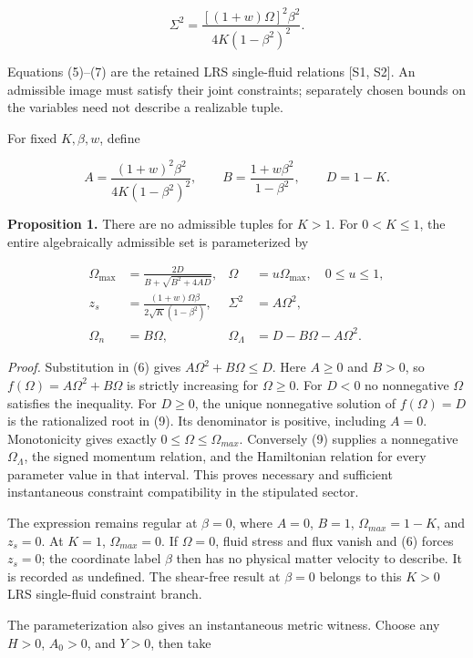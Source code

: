 \documentclass[aps,prd,reprint,onecolumn,nofootinbib]{revtex4-2}
\begin{document}
\[
 \boxed{\displaystyle
 \Sigma^2=\frac{[(1+w)\Omega]^2\beta^2}
                    {4K(1-\beta^2)^2}.}
 \tag{7}
\]

Equations (5)--(7) are the retained LRS single-fluid relations {[}S1, S2{]}. An admissible image must satisfy their joint constraints; separately chosen bounds on the variables need not describe a realizable tuple.

For fixed \(K,\beta,w\), define

\[
 A=\frac{(1+w)^2\beta^2}{4K(1-\beta^2)^2},\qquad
 B=\frac{1+w\beta^2}{1-\beta^2},\qquad D=1-K.
 \tag{8}
\]

\textbf{Proposition 1.} There are no admissible tuples for \(K>1\). For \(0<K\le 1\), the entire algebraically admissible set is parameterized by

\[
 \begin{aligned}
 \Omega_{\max}&=\frac{2D}{B+\sqrt{B^2+4AD}},
 &\Omega&=u\Omega_{\max},\quad 0\le u\le1,\\
 z_s&=\frac{(1+w)\Omega\beta}{2\sqrt K(1-\beta^2)},
 &\Sigma^2&=A\Omega^2,\\
 \Omega_n&=B\Omega,
 &\Omega_\Lambda&=D-B\Omega-A\Omega^2.
 \end{aligned}
 \tag{9}
\]

\emph{Proof.} Substitution in (6) gives \(A\Omega^2+B\Omega\le D\). Here \(A\ge 0\) and \(B>0\), so \(f(\Omega)=A\Omega^2+B\Omega\) is strictly increasing for \(\Omega\ge 0\). For \(D<0\) no nonnegative \(\Omega\) satisfies the inequality. For \(D\ge 0\), the unique nonnegative solution of \(f(\Omega)=D\) is the rationalized root in (9). Its denominator is positive, including \(A=0\). Monotonicity gives exactly \(0\le \Omega\le \Omega_{max}\). Conversely (9) supplies a nonnegative \(\Omega_\Lambda\), the signed momentum relation, and the Hamiltonian relation for every parameter value in that interval. This proves necessary and sufficient instantaneous constraint compatibility in the stipulated sector.

The expression remains regular at \(\beta=0\), where \(A=0\), \(B=1\), \(\Omega_{max}=1-K\), and \(z_s=0\). At \(K=1\), \(\Omega_{max}=0\). If \(\Omega=0\), fluid stress and flux vanish and (6) forces \(z_s=0\); the coordinate label \(\beta\) then has no physical matter velocity to describe. It is recorded as undefined. The shear-free result at \(\beta=0\) belongs to this \(K>0\) LRS single-fluid constraint branch.

The parameterization also gives an instantaneous metric witness. Choose any \(H>0\), \(A_0>0\), and \(Y>0\), then take
\end{document}
